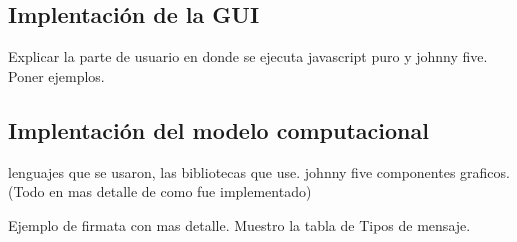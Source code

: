 \subsection{Implentación de la GUI}
\label{subsec:Implentación de la GUI}

Explicar la parte de usuario en donde se ejecuta javascript puro y johnny five.
Poner ejemplos.




\subsection{Implentación del modelo computacional}
\label{subsec:Implentación del modelo computacional}

lenguajes que se usaron, las bibliotecas que use. johnny five
componentes graficos. (Todo en mas detalle de como fue implementado)


Ejemplo de firmata con mas detalle. Muestro la tabla de Tipos de mensaje.




